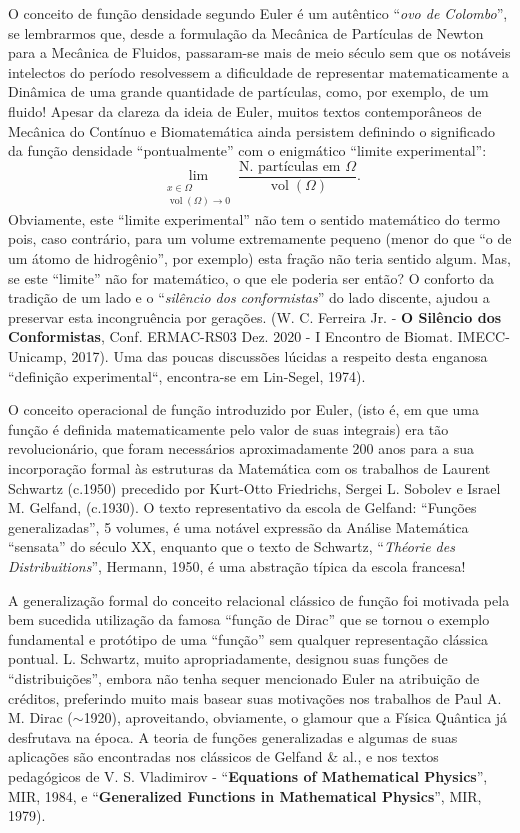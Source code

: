 {\begin{enumerate}
O conceito de função densidade segundo Euler é um autêntico ``\textit{ovo de Colombo}'', se lembrarmos que, desde a formulação da Mecânica de Partículas de Newton para a Mecânica de Fluidos, passaram-se mais de meio século sem que os notáveis intelectos do período resolvessem a dificuldade de representar matematicamente a Dinâmica de uma grande quantidade de partículas, como, por exemplo, de um fluido! Apesar da clareza da ideia de Euler, muitos textos contemporâneos de Mecânica do Contínuo e Biomatemática ainda persistem definindo o significado da função densidade ``pontualmente'' com o enigmático ``limite experimental'':
\[\displaystyle\lim_{\substack{x \in \Omega \\ \operatorname{vol}(\Omega) \to 0}} \dfrac{\mbox{N. partículas em } \Omega}{\operatorname{vol}(\Omega)}.\]
Obviamente, este ``limite experimental'' não tem o sentido matemático do termo pois, caso contrário, para um volume extremamente pequeno (menor do que ``o de um átomo de hidrogênio'', por exemplo) esta fração não teria sentido algum. Mas, se este ``limite'' não for matemático, o que ele poderia ser então? O conforto da tradição de um lado e o ``\textit{silêncio dos conformistas}'' do lado discente, ajudou a preservar esta incongruência por gerações. (W. C. Ferreira Jr. - \textbf{O Silêncio dos Conformistas}, Conf. ERMAC-RS03 Dez. 2020 - I Encontro de Biomat. IMECC-Unicamp, 2017). Uma das poucas discussões lúcidas a respeito desta enganosa ``definição experimental``, encontra-se em Lin-Segel, 1974).

O conceito operacional de função introduzido por Euler, (isto é, em que uma função é definida matematicamente pelo valor de suas integrais) era tão revolucionário, que foram necessários aproximadamente 200 anos para a sua incorporação formal às estruturas da Matemática com os trabalhos de Laurent Schwartz (c.1950) precedido por Kurt-Otto Friedrichs, Sergei L. Sobolev e Israel M. Gelfand, (c.1930). O texto representativo da escola de Gelfand: ``Funções generalizadas'', 5 volumes, é uma notável expressão da Análise Matemática ``sensata'' do século XX, enquanto que o texto de Schwartz, ``\textit{Théorie des Distribuitions}'', Hermann, 1950, é uma abstração típica da escola francesa!

A generalização formal do conceito relacional clássico de função foi motivada pela bem sucedida utilização da famosa ``função de Dirac'' que se tornou o exemplo fundamental e protótipo de uma ``função'' sem qualquer representação clássica pontual. L. Schwartz, muito apropriadamente, designou suas funções de ``distribuições'', embora não tenha sequer mencionado Euler na atribuição de créditos, preferindo muito mais basear suas motivações nos trabalhos de Paul A. M. Dirac (\(\sim\)1920), aproveitando, obviamente, o glamour que a Física Quântica já desfrutava na época. A teoria de funções generalizadas e algumas de suas aplicações são encontradas nos clássicos de Gelfand \& al., e nos textos pedagógicos de V. S. Vladimirov - ``\textbf{Equations of Mathematical Physics}'', MIR, 1984, e ``\textbf{Generalized Functions in Mathematical Physics}'', MIR, 1979).




\end{enumerate}}
